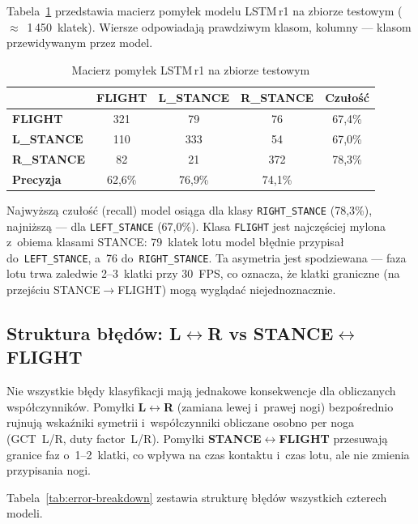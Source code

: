 Tabela~\ref{tab:confusion-lstm} przedstawia macierz pomyłek modelu LSTM\,r1 na zbiorze testowym ($\approx$~1\,450~klatek). Wiersze odpowiadają prawdziwym klasom, kolumny --- klasom przewidywanym przez model.

\begin{table}[htbp]
\centering
\caption{Macierz pomyłek LSTM\,r1 na zbiorze testowym}
\label{tab:confusion-lstm}
\begin{tabular}{l|ccc|c}
 & \textbf{FLIGHT} & \textbf{L\_STANCE} & \textbf{R\_STANCE} & \textbf{Czułość} \\
\hline
\textbf{FLIGHT}      & 321 &  79 &  76 & 67{,}4\% \\
\textbf{L\_STANCE}   & 110 & 333 &  54 & 67{,}0\% \\
\textbf{R\_STANCE}   &  82 &  21 & 372 & 78{,}3\% \\
\hline
\textbf{Precyzja}    & 62{,}6\% & 76{,}9\% & 74{,}1\% & \\
\end{tabular}
\end{table}

Najwyższą czułość (recall) model osiąga dla klasy \texttt{RIGHT\_STANCE} (78{,}3\%), najniższą --- dla \texttt{LEFT\_STANCE} (67{,}0\%). Klasa \texttt{FLIGHT} jest najczęściej mylona z~obiema klasami STANCE: 79~klatek lotu model błędnie przypisał do~\texttt{LEFT\_STANCE}, a~76 do~\texttt{RIGHT\_STANCE}. Ta asymetria jest spodziewana --- faza lotu trwa zaledwie 2--3~klatki przy 30~FPS, co oznacza, że klatki graniczne (na przejściu STANCE$\to$FLIGHT) mogą wyglądać niejednoznacznie.

\subsection{Struktura błędów: L$\leftrightarrow$R vs STANCE$\leftrightarrow$FLIGHT}

Nie wszystkie błędy klasyfikacji mają jednakowe konsekwencje dla obliczanych współczynników. Pomyłki \textbf{L$\leftrightarrow$R} (zamiana lewej i~prawej nogi) bezpośrednio rujnują wskaźniki symetrii i~współczynniki obliczane osobno per noga (GCT~L/R, duty factor~L/R). Pomyłki \textbf{STANCE$\leftrightarrow$FLIGHT} przesuwają granice faz o~1--2~klatki, co wpływa na czas kontaktu i~czas lotu, ale nie zmienia przypisania nogi.

Tabela~\ref{tab:error-breakdown} zestawia strukturę błędów wszystkich czterech modeli.

